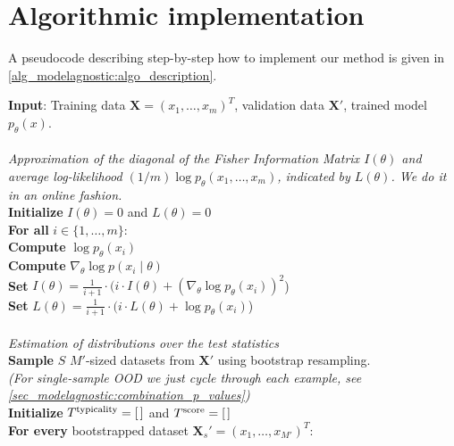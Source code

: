 {\section{Algorithmic implementation}
A pseudocode describing step-by-step how to implement our method is given in \cref{alg_modelagnostic:algo_description}.

\begin{algorithm}[ht]
\begin{algorithmic}
\State \textbf{Input}: Training data $\textbf{X} = (x_1,\ldots,x_m)^T$, validation data $\textbf{X}'$, trained model $p_{\theta}(x)$.\\
\textbf{} \\
\textit{Approximation of the diagonal of the Fisher Information Matrix $I(\theta)$ and average log-likelihood $(1/m)\log p_{\theta}(x_1,\ldots,x_m)$, indicated by $L(\theta)$. We do it in an online fashion.} \\
\textbf{Initialize}  ${I(\theta)} = {0}$ and $L(\theta)=0$ \\
\textbf{For all} $i \in \{1,\ldots ,m\}$: \\
\hspace{1.5em} \textbf{Compute} $\log p_{\theta} ({x}_i)$ \\
\hspace{1.5em} \textbf{Compute} $\nabla_{{\theta}}\log p({x}_i \mid \theta)$ \\
\hspace{1.5em} \textbf{Set}  ${I(\theta)} = \frac{1}{i+1} \cdot (i \cdot {I(\theta)} + (\nabla_{{\theta}}\log p_{\theta}({x}_i))^2$) \\
\hspace{1.5em} \textbf{Set}  $L(\theta) = \frac{1}{i+1} \cdot (i \cdot L(\theta) + \log p_{\theta}({x}_i)$) \\
\textbf{} \\
\textit{Estimation of distributions over the test statistics} \\
\textbf{Sample} $S$ $M'$-sized datasets from $\textbf{X}'$ using bootstrap resampling. \\
\textit{(For single-sample OOD we just cycle through each example, see \cref{sec_modelagnostic:combination_p_values})}\\
\textbf{Initialize}   $T^{\text{typicality}} = [\hspace{0.5mm}]$ and $T^{\text{score}} = [\hspace{0.5mm}]$ \\
\textbf{For every} bootstrapped dataset $\textbf{X}_s' = (x_1, \dots, x_{M'})^T$: \\

\end{algorithmic}
\end{algorithm}}
